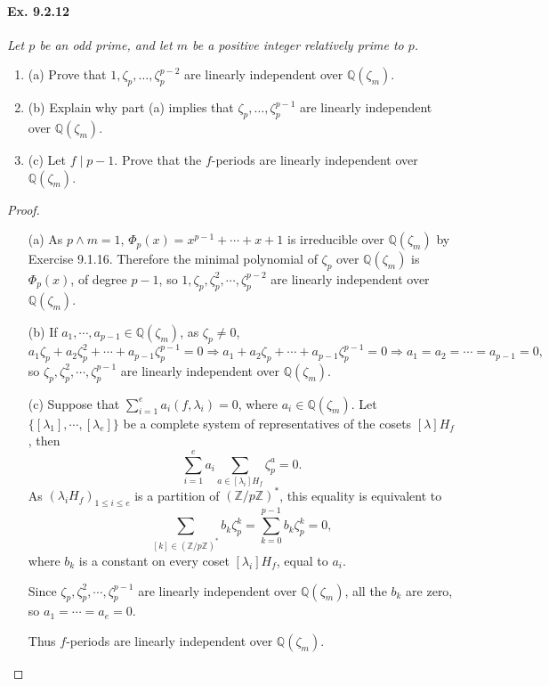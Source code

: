 \documentclass[11pt,a4paper]{article}
\newcommand{\be} {\begin{enumerate}}
\newcommand{\ee} {\end{enumerate}}
\newcommand{\Q}{\mathbb{Q}}
\newcommand{\Z}{\mathbb{Z}}
\begin{document}
\paragraph{Ex. 9.2.12}

{\it Let $p$ be an odd prime, and let $m$ be a positive integer relatively prime to $p$.
\be
\item[(a)] Prove that $1,\zeta_p,\ldots,\zeta_p^{p-2}$ are linearly independent over $\Q(\zeta_m)$.
\item[(b)] Explain why part (a) implies that $\zeta_p,\ldots,\zeta_p^{p-1}$ are linearly independent over $\Q(\zeta_m)$.
\item[(c)] Let $f \mid p-1$. Prove that the $f$-periods are linearly independent over $\Q(\zeta_m)$.
\ee
}

\begin{proof}
\begin{enumerate}
\item[(a)]
As $p\wedge m = 1$, $\Phi_p(x) = x^{p-1}+\cdots+x+1$ is irreducible over $\Q(\zeta_m)$ by Exercise 9.1.16.
Therefore the minimal polynomial of $\zeta_p$ over $\Q(\zeta_m)$ is $\Phi_p(x)$, of degree $p-1$, so $1,\zeta_p,\zeta_p^2,\cdots,\zeta_p^{p-2}$ are linearly independent over $\Q(\zeta_m)$.

\item[(b)]If $a_1,\cdots,a_{p-1} \in \Q(\zeta_m)$, as $\zeta_p\neq 0$,
$$a_1\zeta_p + a_2\zeta_p^2+\cdots+a_{p-1} \zeta_p^{p-1} = 0 \Rightarrow a_1 + a_2\zeta_p+\cdots+a_{p-1} \zeta_p^{p-1} = 0 \Rightarrow a_1=a_2=\cdots=a_{p-1} = 0,$$
so $\zeta_p,\zeta_p^2,\cdots,\zeta_p^{p-1}$ are linearly independent over $\Q(\zeta_m)$.

\item[(c)] Suppose that $\sum\limits_{i=1}^{e} a_i (f,\lambda_i) = 0$, where $a_i \in \Q(\zeta_m)$. Let $\{[\lambda_1],\cdots,[\lambda_{e}]\}$ be a complete system of representatives of the cosets $[\lambda] H_f$, then
$$\sum_{i=1}^{e} a_i \sum_{a \in [\lambda_i] H_f}  \zeta_p^a = 0.$$
As $(\lambda_i H_f)_{1\leq i \leq e}$ is a partition of $(\Z/p\Z)^*$, this equality is equivalent to 
$$\sum_{[k] \in (\Z/p\Z)^*} b_k \zeta_p^k = \sum_{k=0}^{p-1} b_k \zeta_p^k=  0,$$
where $b_k$ is a constant on every coset  $[\lambda_i]H_f$, equal to $a_i$. 

Since $\zeta_p,\zeta_p^2,\cdots,\zeta_p^{p-1}$ are linearly independent over $\Q(\zeta_m)$, all the $b_k$ are zero, so  $a_1 = \cdots = a_e = 0$.

Thus $f$-periods are linearly independent over $\Q(\zeta_m)$.
\end{enumerate}
\end{proof}
\end{document}
